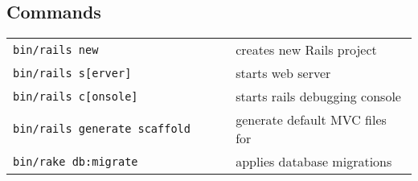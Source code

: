 \documentclass[6pt]{article}
\begin{document}
\begin{multicols}{3}
  \subsection{Commands}
  \begin{tabular}{L{0.55\linewidth} L{0.45\linewidth}}
    \tt bin/rails new  & creates new Rails project \\
    \tt bin/rails s[erver] & starts web server\\
    \tt bin/rails c[onsole] & starts rails debugging console\\
    \tt bin/rails generate scaffold  & generate default MVC files for \\
    \tt bin/rake db:migrate & applies database migrations \\
  \end{tabular}

\end{multicols}
\end{document}
